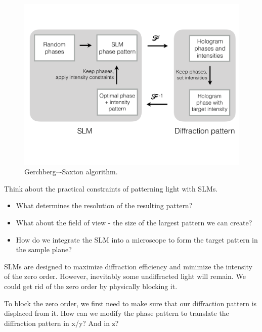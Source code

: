 \documentclass[a4paper]{report}
\newcommand{\nexercise}[0]{\arabic{exercises}\addtocounter{exercises}{1}}
\begin{document}
\begin{figure}
  \centering
      \includegraphics[width=.7\textwidth,trim={0 6cm 0 0},clip]{gs_algorithm.pdf}
  \caption{Gerchberg–-Saxton algorithm.}
  \label{fig:gs_algorithm}  
\end{figure}

\begin{exercisebox}[frametitle={Exercise \nexercise}: Practical considerations]
Think about the practical constraints of patterning light with SLMs.
\begin{itemize}
	\item What determines the resolution of the resulting pattern? 
	\item What about the field of view - the size of the largest pattern we can create?
	\item How do we integrate the SLM into a microscope to form the target pattern in the sample plane? 
\end{itemize}
\end{exercisebox}

SLMs are designed to maximize diffraction efficiency and minimize the intensity of the zero order. However, inevitably some undiffracted light will remain. We could get rid of the zero order by physically blocking it.

\begin{exercisebox}[frametitle={Exercise \nexercise}: Eliminating zero-order diffraction]
To block the zero order, we first need to make sure that our diffraction pattern is displaced from it. How can we modify the phase pattern to translate the diffraction pattern in x/y? And in z?
\end{exercisebox}
\end{document}
